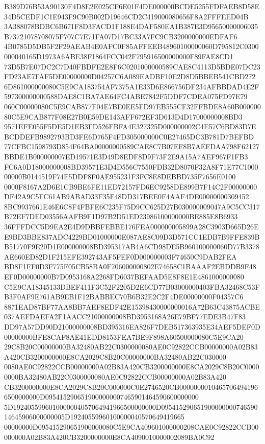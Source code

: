 \documentclass[UTF8,fontset=fandol,zihao=-4,a4paper]{ctexart}
\begin{document}
{{B389D76B53A90130F4D8E2E025CF6E01F4DE000000BCDE5255FDFAEB8D58E34D5CEDF1C1E943F9C90B002D19646CD2C419000080656F8A2FFFEED04B
3A388078BDBC6B671F8D3FACD1F188E4DAF580EA1B387E3D95650000006035B73721078708075F707C7E71FA07D17BC33A7FC9CB3200000000EDFAF6
4B0785D5DB5F2F29AEAB4E0AFC0F85AFFEEB48960100000060D795812C0300000040165D1973A6ABE38F1864FCC042F795916500000000F89FAE8CD1
73D5B7E07DC2C7D40FBDFE2E8F6C0201000000589CAE8C4113D5BDE07DC23FD23AE7FAF5DE00000000D04257C6A089EADBF10E2D8D5BBEB541CBD272
6D861000000080C5E9CA183754AF7375A1E33D6E866756DF234AFBBDAD4E2F597300000000588DAE8C1BA7AE64FC4ABE7842F5DDF7CDEA075FD97E79
060C00000080C5E9CAB877F04E7BE0EE5FD97EB555CF32FFBDE8A60B00000080C5E9CAB877F08E27B0E59DE143AFF672EF3D613D4D17000000008BD3
9571EFE055F5DE5D1EB3FD526FBFA4E327325D000000002C4E57C6BD83D7EBCDDEFB9892793BD3FE6D765F4FD305000000C0E27465DC3B781D7BEFBD
77CFBC1598793D854F64BA00000000589CAE8C7B07EF8B7AEFDAA798F62127BBDE1B000000007ED19571E3D49D8EDF8D9F73F2E9A15A7AEF967F1FB3
FC6A0D18000000008BD39571E3D4D556C7550FDB32D8070F32A8F71E77C100000000B0144519F74E5DDF8F0AE955231F3FC8E8DEBBD735F7656E0100
0000F8167A2D6E1CB9BE6FE11ED72157FD6EC9258DE899B7F14C2F00000000DF42A9C5FC61AB9ABAD33F35F48DD317BEE0F4AAF4DE00000000309452
8BC9937661E46E6C8F4FBFE6C235F75D9CC625D27B030000009047A9C5CC317B72EF7DED03556AAFB9F1D97B2D51ED23986100000000BE885E8B6933
36FFFDCC5D9EA2E4D9DBBFEBBE176FEA000000005899A28C3903D665D26EE9BD3BBE837ADC4229BD01000000E087AE8C09D3D571CC1EDB7B9FFE839B
B51770F9E20D1E000000008BD395317AB4A6CD98DE5B960100000060D77B3378AE660ED82D1F215EFE392743AF5FEF0D000000003F74650C9DAB2FEA
BD8F1FF0D3F775F05CB58BA0F706000000802E74658C1BAAAF2EBDDB9F48EF0D00000000B7D0953168A2268FD6037BEFAAD5E8F8E1E4861000000080
C5E9CA18345133DBEF411F3C52F2205D2E6CD77B03000000403FBA32468C53FB3F0AF9E761AB9EB1F12BABBEC70B6B32E2C2F4DE00000000F04357C6
8871EAD87BF77AA8BB7AEF8EDF42E15398430000000016A72B63C43875ACBE037AEFDAEFA2F1AACC21000000008BD3953168A26E79BF77EDE3B47F83
DD97A57DD90D21000000008BD395316EA826F7DEB517363935E34AEF5DEF0D00000000BFE8CAF8AE41EDD8153FEA7BE9F898A60500000080C5E9CA20
29C8B20C00000000BA32480AB22C0300000080AE0C92822CCB00000000A02B83A420CB3200000000E8CA2029C8B20C00000000BA32480AB22C030000
0080AE0C92822CCB00000000A02B83A420CB3200000000E8CA2029C8B20C00000000BA32480AB22C0300000080AE0C92822CCB00000000A02B83A420
CB3200000000E8CA2029C8B20C000000C0E2746520CB00000000104657064941966500000000D0954152906519000000007465901464590600000000
5D1924055996010000004057064941966500000000D09541529065190000000074659014645906000000005D19240559960100000040570649419665
00000000D095415290651900000080C5E9CA409601000000208CAE0C92822CCB00000000A02B83A420CB3200000000E8CA4090010000002089BA0C92
}}
\end{document}
